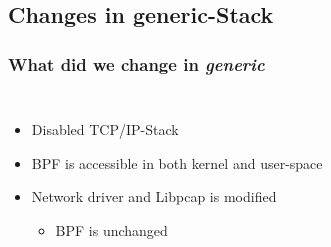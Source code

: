 \documentclass{beamer}
\begin{document}
\subsection*{Changes in generic-Stack}
\begin{frame}
	\frametitle{What did we change in \emph{generic}}
\begin{columns}
\begin{itemize}
	\item <2->Disabled TCP/IP-Stack\newline
	\item <3->BPF is accessible in both kernel and user-space\newline
	\item <4->Network driver and Libpcap is modified
		\begin{itemize}
			\item BPF is unchanged
		\end{itemize}
\end{itemize}
\vspace{-2em}

\end{columns}
\end{frame}
\end{document}
